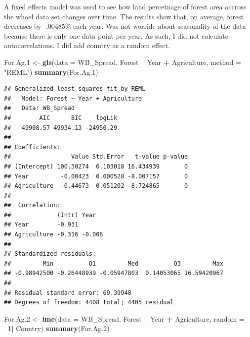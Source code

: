 \documentclass[12pt,]{article}
\newenvironment{Shaded}{\begin{snugshade}}{\end{snugshade}}
\newcommand{\KeywordTok}[1]{\textcolor[rgb]{0.13,0.29,0.53}{\textbf{#1}}}
\newcommand{\DataTypeTok}[1]{\textcolor[rgb]{0.13,0.29,0.53}{#1}}
\newcommand{\DecValTok}[1]{\textcolor[rgb]{0.00,0.00,0.81}{#1}}
\newcommand{\StringTok}[1]{\textcolor[rgb]{0.31,0.60,0.02}{#1}}
\newcommand{\OperatorTok}[1]{\textcolor[rgb]{0.81,0.36,0.00}{\textbf{#1}}}
\newcommand{\NormalTok}[1]{#1}
\begin{document}
A fixed effects model was used to see how land percetnage of forest area
accross the whoel data set changes over time. The results show that, on
average, forest decreases by -.00485\% each year. Was not worride about
seasonality of the data because there is only one data point per year.
As such, I did not calculate autocorrelations. I did add country as a
random effect.

\begin{Shaded}
\begin{Highlighting}[]
\NormalTok{For.Ag.}\DecValTok{1}\NormalTok{ <-}\StringTok{ }\KeywordTok{gls}\NormalTok{(}\DataTypeTok{data =}\NormalTok{ WB_Spread, }
\NormalTok{                    Forest }\OperatorTok{~}\StringTok{ }\NormalTok{Year }\OperatorTok{+}\StringTok{ }\NormalTok{Agriculture,}
                    \DataTypeTok{method =} \StringTok{"REML"}\NormalTok{)}
\KeywordTok{summary}\NormalTok{(For.Ag.}\DecValTok{1}\NormalTok{)}
\end{Highlighting}
\end{Shaded}

\begin{verbatim}
## Generalized least squares fit by REML
##   Model: Forest ~ Year + Agriculture 
##   Data: WB_Spread 
##        AIC      BIC    logLik
##   49908.57 49934.13 -24950.29
## 
## Coefficients:
##                 Value Std.Error   t-value p-value
## (Intercept) 100.30274  6.103018 16.434939       0
## Year         -0.00423  0.000528 -8.007157       0
## Agriculture  -0.44673  0.051202 -8.724865       0
## 
##  Correlation: 
##             (Intr) Year  
## Year        -0.931       
## Agriculture -0.316 -0.006
## 
## Standardized residuals:
##         Min          Q1         Med          Q3         Max 
## -0.98942500 -0.26448939 -0.05947803  0.14053065 16.59420967 
## 
## Residual standard error: 69.39948 
## Degrees of freedom: 4408 total; 4405 residual
\end{verbatim}

\begin{Shaded}
\begin{Highlighting}[]
\NormalTok{For.Ag.}\DecValTok{2}\NormalTok{ <-}\StringTok{  }\KeywordTok{lme}\NormalTok{(}\DataTypeTok{data =}\NormalTok{ WB_Spread,}
\NormalTok{              Forest }\OperatorTok{~}\StringTok{ }\NormalTok{Year }\OperatorTok{+}\StringTok{ }\NormalTok{Agriculture,}
              \DataTypeTok{random =} \OperatorTok{~}\DecValTok{1}\OperatorTok{|}\StringTok{ }\NormalTok{Country)}
\KeywordTok{summary}\NormalTok{(For.Ag.}\DecValTok{2}\NormalTok{)}
\end{Highlighting}
\end{Shaded}
\end{document}
